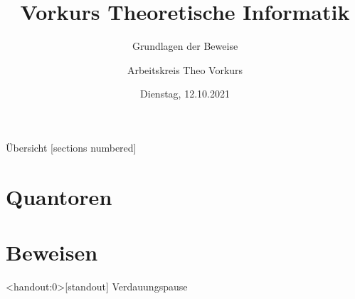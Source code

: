 %
%
%
%



\title{Vorkurs Theoretische Informatik}
\subtitle{Grundlagen der Beweise}
\date{Dienstag, 12.10.2021}
\author{Arbeitskreis Theo Vorkurs}



\maketitle

\begin{frame}[fragile]{Übersicht}
  [sections numbered]
  \tableofcontents
\end{frame}

\section{Quantoren}



\section{Beweisen}



\begin{frame}<handout:0>[standout]
	Verdauungspause
\end{frame}





